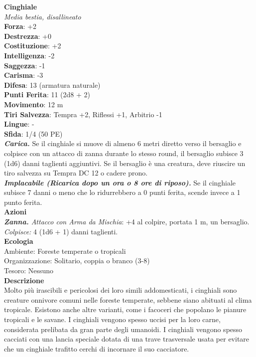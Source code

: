 \begin{multicols}{2}
\medskip\textbf{Cinghiale}\\
\emph{Media bestia, disallineato}\\
\textbf{Forza}: +2\\
\textbf{Destrezza}: +0\\
\textbf{Costituzione}: +2\\
\textbf{Intelligenza}: -2\\
\textbf{Saggezza}: -1\\
\textbf{Carisma}: -3\\
\textbf{Difesa}: 13 (armatura naturale)\\
\textbf{Punti Ferita}: 11 (2d8 + 2)\\
\textbf{Movimento}: 12 m\\
\textbf{Tiri Salvezza}: Tempra +2, Riflessi +1, Arbitrio -1 \\
\textbf{Lingue}: -\\
\textbf{Sfida}: 1/4 (50 PE)\smallskip\\
\emph{\textbf{Carica.}} Se il cinghiale si muove di almeno 6 metri diretto verso il bersaglio e colpisce con un attacco di zanna durante lo stesso round, il bersaglio subisce 3 (1d6) danni taglienti aggiuntivi. Se il bersaglio è una creatura, deve riuscire un tiro salvezza su Tempra DC  12 o cadere prono.\\
\emph{\textbf{Implacabile (Ricarica dopo un ora o 8 ore di riposo).}} Se il cinghiale subisce 7 danni o meno che lo ridurrebbero a 0 punti ferita, scende invece a 1 punto ferita.\\
\smallskip\textbf{Azioni}\\
\emph{\textbf{Zanna.} Attacco con Arma da Mischia}: +4 al colpire, portata 1 m, un bersaglio.\\
\emph{Colpisce:} 4 (1d6 + 1) danni taglienti. \\
\textbf{Ecologia}\\
Ambiente: Foreste temperate o tropicali\\
Organizzazione: Solitario, coppia o branco (3-8)\\
Tesoro: Nessuno\\
\textbf{Descrizione}\\

Molto più irascibili e pericolosi dei loro simili addomesticati, i cinghiali sono creature onnivore comuni nelle foreste temperate, sebbene siano abituati al clima tropicale. Esistono anche altre varianti, come i facoceri che popolano le pianure tropicali e le savane. I cinghiali vengono spesso uccisi per la loro carne, considerata prelibata da gran parte degli umanoidi. I cinghiali vengono spesso cacciati con una lancia speciale dotata di una trave trasversale usata per evitare che un cinghiale trafitto cerchi di incornare il suo cacciatore.\\


\end{multicols}
